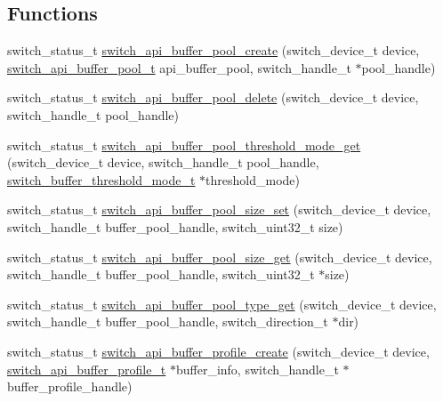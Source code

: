 \subsection*{Functions}
\begin{DoxyCompactItemize}
\item 
switch\+\_\+status\+\_\+t \hyperlink{group__Buffer_ga9224535589ad5184a595bef1be38f9ef}{switch\+\_\+api\+\_\+buffer\+\_\+pool\+\_\+create} (switch\+\_\+device\+\_\+t device, \hyperlink{group__Buffer_ga1302c4962b38d77d99766608e5cb4ccd}{switch\+\_\+api\+\_\+buffer\+\_\+pool\+\_\+t} api\+\_\+buffer\+\_\+pool, switch\+\_\+handle\+\_\+t $\ast$pool\+\_\+handle)
\item 
switch\+\_\+status\+\_\+t \hyperlink{group__Buffer_gaf6f6547f3b05ed3deb5331f68fff2498}{switch\+\_\+api\+\_\+buffer\+\_\+pool\+\_\+delete} (switch\+\_\+device\+\_\+t device, switch\+\_\+handle\+\_\+t pool\+\_\+handle)
\item 
switch\+\_\+status\+\_\+t \hyperlink{group__Buffer_ga1ec34c2fd18f046e44667a30b9fc3ad8}{switch\+\_\+api\+\_\+buffer\+\_\+pool\+\_\+threshold\+\_\+mode\+\_\+get} (switch\+\_\+device\+\_\+t device, switch\+\_\+handle\+\_\+t pool\+\_\+handle, \hyperlink{group__Buffer_gad5d808c4c42a170d1afae11767fddeff}{switch\+\_\+buffer\+\_\+threshold\+\_\+mode\+\_\+t} $\ast$threshold\+\_\+mode)
\item 
switch\+\_\+status\+\_\+t \hyperlink{group__Buffer_ga0f1416e4c28729265cf2f53aed22dd24}{switch\+\_\+api\+\_\+buffer\+\_\+pool\+\_\+size\+\_\+set} (switch\+\_\+device\+\_\+t device, switch\+\_\+handle\+\_\+t buffer\+\_\+pool\+\_\+handle, switch\+\_\+uint32\+\_\+t size)
\item 
switch\+\_\+status\+\_\+t \hyperlink{group__Buffer_ga69f35413ab136ac9405d57104f8c550d}{switch\+\_\+api\+\_\+buffer\+\_\+pool\+\_\+size\+\_\+get} (switch\+\_\+device\+\_\+t device, switch\+\_\+handle\+\_\+t buffer\+\_\+pool\+\_\+handle, switch\+\_\+uint32\+\_\+t $\ast$size)
\item 
switch\+\_\+status\+\_\+t \hyperlink{group__Buffer_ga75a6ab35e64f16e0cd4a59ffd7834cf1}{switch\+\_\+api\+\_\+buffer\+\_\+pool\+\_\+type\+\_\+get} (switch\+\_\+device\+\_\+t device, switch\+\_\+handle\+\_\+t buffer\+\_\+pool\+\_\+handle, switch\+\_\+direction\+\_\+t $\ast$dir)
\item 
switch\+\_\+status\+\_\+t \hyperlink{group__Buffer_gabe5ac42792abfc65b5b06e2d971cf577}{switch\+\_\+api\+\_\+buffer\+\_\+profile\+\_\+create} (switch\+\_\+device\+\_\+t device, \hyperlink{group__Buffer_ga4d903bc1adf700cb1f2c3313c953e059}{switch\+\_\+api\+\_\+buffer\+\_\+profile\+\_\+t} $\ast$buffer\+\_\+info, switch\+\_\+handle\+\_\+t $\ast$buffer\+\_\+profile\+\_\+handle)

\end{DoxyCompactItemize}
